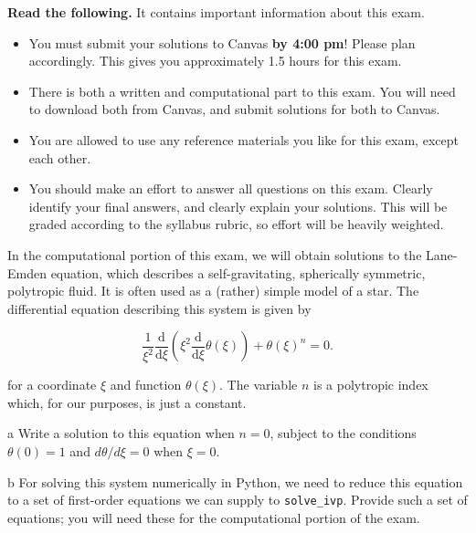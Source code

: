 \documentclass[]{homework}
\begin{document}

  \noindent\textbf{Read the following.} It contains important information
  about this exam.

  \begin{itemize}
    \item You must submit your solutions
    to Canvas \textbf{by 4:00 pm}! Please plan accordingly.
    This gives you approximately 1.5 hours for this exam.
    \item There is both a written and computational part to this exam. You
    will need to download both from Canvas, and submit solutions for both to Canvas.
    \item You are allowed to use any reference materials you like for this
      exam, except each other.
    \item You should make an effort to answer all questions on this exam.
      Clearly identify your final answers, and clearly explain your solutions.
      This will be graded according to the syllabus rubric, so effort will be
      heavily weighted.
  \end{itemize}


\begin{problem}{1}
  In the computational portion of this exam, we will obtain solutions to the
  Lane-Emden equation, which describes a self-gravitating, spherically symmetric,
  polytropic fluid.  It is often used as a (rather) simple model of a star.
  The differential equation describing this system is given by

  \[
  \frac1{\xi^2} \frac{\mathrm{d}}{\mathrm{d}\xi} \left( \xi^2 \frac{\mathrm{d}}{\mathrm{d}\xi} \theta(\xi) \right) + \theta(\xi)^n = 0.
  \]

  for a coordinate $\xi$ and function $\theta(\xi)$. The variable $n$ is a polytropic
  index which, for our purposes, is just a constant.

  \begin{subproblem}{a}
    Write a solution to this equation when $n = 0$, subject to the conditions
    $\theta(0) = 1$ and $d\theta/d\xi = 0$ when $\xi = 0$.

  \end{subproblem}
  \begin{subproblem}{b}
    For solving this system numerically in Python, we need to reduce this equation to a set
    of first-order equations we can supply to \texttt{solve\_ivp}. Provide such a set of
    equations; you will need these for the computational portion of the exam.
  \end{subproblem}

\end{problem}
\end{document}
